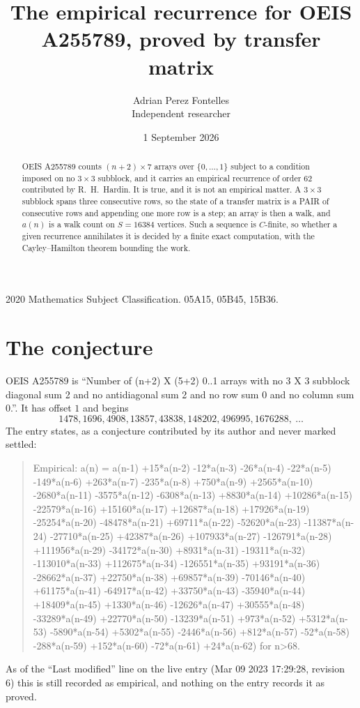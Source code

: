 \documentclass[11pt,a4paper]{article}
\title{The empirical recurrence for OEIS A255789, proved by transfer matrix}
\author{Adrian Perez Fontelles\\ \small Independent researcher}
\date{1 September 2026}
\theoremstyle{plain}
\theoremstyle{definition}
\begin{document}
\maketitle

\begin{abstract}
OEIS A255789 counts $(n+2)\times7$ arrays over $\{0,\dots,1\}$ subject to a condition imposed on
no $3\times3$ subblock, and it carries an empirical recurrence of order $62$
contributed by R.~H.~Hardin. It is true, and it is not an empirical matter. A $3\times3$
subblock spans three consecutive rows, so the state of a transfer matrix is a PAIR of
consecutive rows and appending one more row is a step; an array is then a walk, and
$a(n)$ is a walk count on $S=16384$ vertices. Such a sequence is $C$-finite, so whether a given
recurrence annihilates it is decided by a finite exact computation, with the Cayley--Hamilton
theorem bounding the work.
\end{abstract}

\noindent\small 2020 Mathematics Subject Classification. 05A15, 05B45, 15B36.\normalsize

\section{The conjecture}

OEIS A255789 is ``Number of (n+2) X (5+2) 0..1 arrays with no 3 X 3 subblock diagonal sum 2 and no antidiagonal sum 2 and no row sum 0 and no column sum 0.''. It has offset $1$ and begins
\[
1478, 1696, 4908, 13857, 43838, 148202, 496995, 1676288,\ \dots
\]
The entry states, as a conjecture contributed by its author and never marked settled:
\begin{quote}
Empirical: a(n) = a(n-1) +15*a(n-2) -12*a(n-3) -26*a(n-4) -22*a(n-5) -149*a(n-6) +263*a(n-7) -235*a(n-8) +750*a(n-9) +2565*a(n-10) -2680*a(n-11) -3575*a(n-12) -6308*a(n-13) +8830*a(n-14) +10286*a(n-15) -22579*a(n-16) +15160*a(n-17) +12687*a(n-18) +17926*a(n-19) -25254*a(n-20) -48478*a(n-21) +69711*a(n-22) -52620*a(n-23) -11387*a(n-24) -27710*a(n-25) +42387*a(n-26) +107933*a(n-27) -126791*a(n-28) +111956*a(n-29) -34172*a(n-30) +8931*a(n-31) -19311*a(n-32) -113010*a(n-33) +112675*a(n-34) -126551*a(n-35) +93191*a(n-36) -28662*a(n-37) +22750*a(n-38) +69857*a(n-39) -70146*a(n-40) +61175*a(n-41) -64917*a(n-42) +33750*a(n-43) -35940*a(n-44) +18409*a(n-45) +1330*a(n-46) -12626*a(n-47) +30555*a(n-48) -33289*a(n-49) +22770*a(n-50) -13239*a(n-51) +973*a(n-52) +5312*a(n-53) -5890*a(n-54) +5302*a(n-55) -2446*a(n-56) +812*a(n-57) -52*a(n-58) -288*a(n-59) +152*a(n-60) -72*a(n-61) +24*a(n-62) for n>68.
\end{quote}
As of the ``Last modified'' line on the live entry (Mar 09 2023 17:29:28, revision 6) this is still
recorded as empirical, and nothing on the entry records it as proved.
\end{document}
